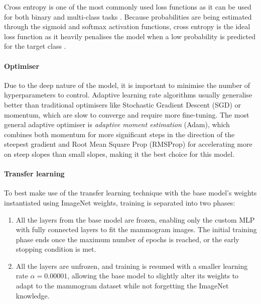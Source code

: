 Cross entropy is one of the most commonly used loss functions as it can be used for both binary and multi-class tasks \citep{Litjens2017}. Because probabilities are being estimated through the sigmoid and softmax activation functions, cross entropy is the ideal loss function as it heavily penalises the model when a low probability is predicted for the target class \citep{Geron2019}.

\paragraph{Optimiser}

Due to the deep nature of the model, it is important to minimise the number of hyperparameters to control. Adaptive learning rate algorithms usually generalise better than traditional optimisers like Stochastic Gradient Descent (SGD) or momentum, which are slow to converge and require more fine-tuning. The most general adaptive optimiser is \textit{adaptive moment estimation} (Adam), which combines both momentum for more significant steps in the direction of the steepest gradient and Root Mean Square Prop (RMSProp) for accelerating more on steep slopes than small slopes, making it the best choice for this model.

\paragraph{Transfer learning}
\label{sec:design-transfer-learning-training-phase}

To best make use of the transfer learning technique with the base model's weights instantiated using ImageNet weights, training is separated into two phases:
\begin{enumerate}
    \item All the layers from the base model are frozen, enabling only the custom MLP with fully connected layers to fit the mammogram images. The initial training phase ends once the maximum number of epochs is reached, or the early stopping condition is met.
    \item All the layers are unfrozen, and training is resumed with a smaller learning rate $\alpha = 0.00001$, allowing the base model to slightly alter its weights to adapt to the mammogram dataset while not forgetting the ImageNet knowledge.
\end{enumerate}

